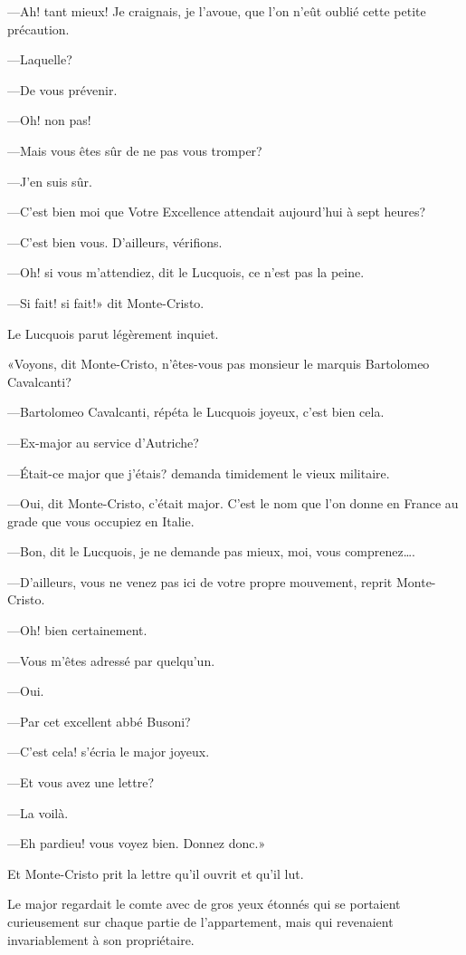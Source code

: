 —Ah! tant mieux! Je craignais, je l'avoue, que l'on n'eût oublié cette petite précaution. 

—Laquelle? 

—De vous prévenir. 

—Oh! non pas! 

—Mais vous êtes sûr de ne pas vous tromper? 

—J'en suis sûr. 

—C'est bien moi que Votre Excellence attendait aujourd'hui à sept heures? 

—C'est bien vous. D'ailleurs, vérifions. 

—Oh! si vous m'attendiez, dit le Lucquois, ce n'est pas la peine. 

—Si fait! si fait!» dit Monte-Cristo. 

Le Lucquois parut légèrement inquiet. 

«Voyons, dit Monte-Cristo, n'êtes-vous pas monsieur le marquis Bartolomeo Cavalcanti? 

—Bartolomeo Cavalcanti, répéta le Lucquois joyeux, c'est bien cela. 

—Ex-major au service d'Autriche? 

—Était-ce major que j'étais? demanda timidement le vieux militaire. 

—Oui, dit Monte-Cristo, c'était major. C'est le nom que l'on donne en France au grade que vous occupiez en Italie. 

—Bon, dit le Lucquois, je ne demande pas mieux, moi, vous comprenez\dots. 

—D'ailleurs, vous ne venez pas ici de votre propre mouvement, reprit Monte-Cristo. 

—Oh! bien certainement. 

—Vous m'êtes adressé par quelqu'un. 

—Oui. 

—Par cet excellent abbé Busoni? 

—C'est cela! s'écria le major joyeux. 

—Et vous avez une lettre? 

—La voilà. 

—Eh pardieu! vous voyez bien. Donnez donc.» 

Et Monte-Cristo prit la lettre qu'il ouvrit et qu'il lut. 

Le major regardait le comte avec de gros yeux étonnés qui se portaient curieusement sur chaque partie de l'appartement, mais qui revenaient invariablement à son propriétaire. 

